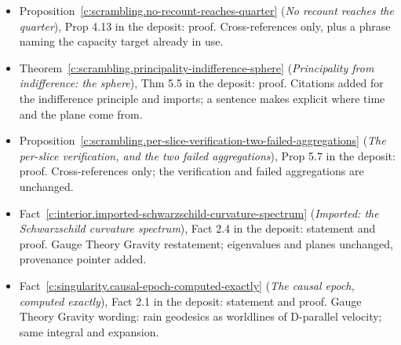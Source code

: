 \documentclass[11pt]{article}
\theoremstyle{definition}
\theoremstyle{plain}
\begin{document}
\begin{itemize}
\item Proposition~\ref{c:scrambling.no-recount-reaches-quarter} (\emph{No recount reaches the quarter}), Prop 4.13 in the deposit: proof. Cross-references only, plus a phrase naming the capacity target already in use.
\item Theorem~\ref{c:scrambling.principality-indifference-sphere} (\emph{Principality from indifference: the sphere}), Thm 5.5 in the deposit: proof. Citations added for the indifference principle and imports; a sentence makes explicit where time and the plane come from.
\item Proposition~\ref{c:scrambling.per-slice-verification-two-failed-aggregations} (\emph{The per-slice verification, and the two failed aggregations}), Prop 5.7 in the deposit: proof. Cross-references only; the verification and failed aggregations are unchanged.
\item Fact~\ref{c:interior.imported-schwarzschild-curvature-spectrum} (\emph{Imported: the Schwarzschild curvature spectrum}), Fact 2.4 in the deposit: statement and proof. Gauge Theory Gravity restatement; eigenvalues and planes unchanged, provenance pointer added.
\item Fact~\ref{c:singularity.causal-epoch-computed-exactly} (\emph{The causal epoch, computed exactly}), Fact 2.1 in the deposit: statement and proof. Gauge Theory Gravity wording: rain geodesics as worldlines of D-parallel velocity; same integral and expansion.
\end{itemize}
\end{document}
